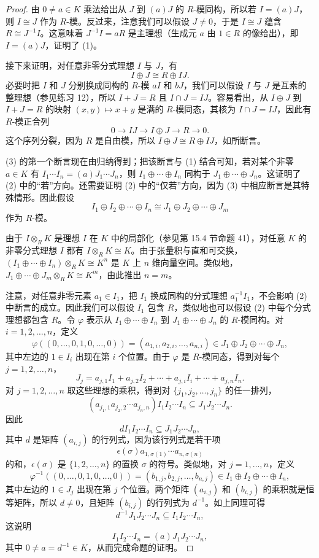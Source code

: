 \begin{proof}
由 $0\neq a\in K$ 乘法给出从 $J$ 到 $(a)J$ 的 $R$-模同构，所以若 $I=(a)J$，则 $I\cong J$ 作为 $R$-模。反过来，注意我们可以假设 $J\neq0$，于是 $I\cong J$ 蕴含 $R\cong J^{-1}I$。这意味着 $J^{-1}I=aR$ 是主理想（生成元 $a$ 由 $1\in R$ 的像给出），即 $I=(a)J$，证明了 (1)。

接下来证明，对任意非零分式理想 $I$ 与 $J$，有
\[
  I\oplus J\cong R\oplus IJ.
\]
必要时把 $I$ 和 $J$ 分别换成同构的 $R$-模 $aI$ 和 $bJ$，我们可以假设 $I$ 与 $J$ 是互素的整理想（参见练习 12），所以 $I+J=R$ 且 $I\cap J=IJ$。容易看出，从 $I\oplus J$ 到 $I+J=R$ 的映射 $(x,y)\mapsto x+y$ 是满的 $R$-模同态，其核为 $I\cap J=IJ$，因此有 $R$-模正合列
\[
  0\to IJ\to I\oplus J\to R\to0.
\]
这个序列分裂，因为 $R$ 是自由模，所以 $I\oplus J\cong R\oplus IJ$，如所断言。

(3) 的第一个断言现在由归纳得到；把该断言与 (1) 结合可知，若对某个非零 $a\in K$ 有 $I_1\cdots I_n=(a)J_1\cdots J_n$，则 $I_1\oplus\cdots\oplus I_n$ 同构于 $J_1\oplus\cdots\oplus J_n$。这证明了 (2) 中的“若”方向。还需要证明 (2) 中的“仅若”方向，因为 (3) 中相应断言是其特殊情形。因此假设
\[
  I_1\oplus I_2\oplus\cdots\oplus I_n
  \cong
  J_1\oplus J_2\oplus\cdots\oplus J_m
\]
作为 $R$-模。

由于 $I\otimes_R K$ 是理想 $I$ 在 $K$ 中的局部化（参见第 15.4 节命题 41），对任意 $K$ 的非零分式理想 $I$ 都有 $I\otimes_R K\cong K$。由于张量积与直和可交换，$(I_1\oplus\cdots\oplus I_n)\otimes_R K\cong K^n$ 是 $K$ 上 $n$ 维向量空间。类似地，$J_1\oplus\cdots\oplus J_m\otimes_R K\cong K^m$，由此推出 $n=m$。

注意，对任意非零元素 $a_1\in I_1$，把 $I_1$ 换成同构的分式理想 $a_1^{-1}I_1$，不会影响 (2) 中断言的成立。因此我们可以假设 $I_1$ 包含 $R$，类似地也可以假设 (2) 中每个分式理想都包含 $R$。令 $\varphi$ 表示从 $I_1\oplus\cdots\oplus I_n$ 到 $J_1\oplus\cdots\oplus J_n$ 的 $R$-模同构。对 $i=1,2,
\ldots,n$，定义
\[
  \varphi((0,
  \ldots,0,1,0,
  \ldots,0))=(a_{1,i},a_{2,i},
  \ldots,a_{n,i})\in J_1\oplus J_2\oplus\cdots\oplus J_n,
\]
其中左边的 $1\in I_i$ 出现在第 $i$ 个位置。由于 $\varphi$ 是 $R$-模同态，得到对每个 $j=1,2,
\ldots,n$，
\[
  J_j=a_{j,1}I_1+a_{j,2}I_2+\cdots+a_{j,i}I_i+\cdots+a_{j,n}I_n.
\]
对 $j=1,2,
\ldots,n$ 取这些理想的乘积，得到对 $\{j_1,j_2,
\ldots,j_n\}$ 的任一排列，
\[
  (a_{j_1,1}a_{j_2,2}\cdots a_{j_n,n})I_1I_2\cdots I_n
  \subseteq
  J_1J_2\cdots J_n.
\]
因此
\[
  dI_1I_2\cdots I_n\subseteq J_1J_2\cdots J_n,
\]
其中 $d$ 是矩阵 $(a_{i,j})$ 的行列式，因为该行列式是若干项
\[
  \epsilon(\sigma)a_{1,\sigma(1)}\cdots a_{n,\sigma(n)}
\]
的和，$\epsilon(\sigma)$ 是 $\{1,2,
\ldots,n\}$ 的置换 $\sigma$ 的符号。类似地，对 $j=1,
\ldots,n$，定义
\[
  \varphi^{-1}((0,
  \ldots,0,1,0,
  \ldots,0))=(b_{1,j},b_{2,j},
  \ldots,b_{n,j})\in I_1\oplus I_2\oplus\cdots\oplus I_n,
\]
其中左边的 $1\in J_j$ 出现在第 $j$ 个位置。两个矩阵 $(a_{i,j})$ 和 $(b_{i,j})$ 的乘积就是恒等矩阵，所以 $d\neq0$，且矩阵 $(b_{i,j})$ 的行列式为 $d^{-1}$。如上同理可得
\[
  d^{-1}J_1J_2\cdots J_n\subseteq I_1I_2\cdots I_n,
\]
这说明
\[
  I_1I_2\cdots I_n=(a)J_1J_2\cdots J_n,
\]
其中 $0\neq a=d^{-1}\in K$，从而完成命题的证明。
\end{proof}

